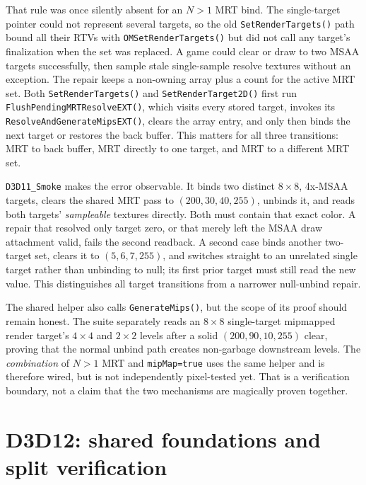 That rule was once silently absent for an \(N>1\) MRT bind. The single-target pointer could not
represent several targets, so the old \texttt{SetRenderTargets()} path bound all their RTVs with
\texttt{OMSetRenderTargets()} but did not call any target's finalization when the set was
replaced. A game could clear or draw to two MSAA targets successfully, then sample stale
single-sample resolve textures without an exception. The repair keeps a non-owning array plus a
count for the active MRT set. Both \texttt{SetRenderTargets()} and
\texttt{SetRenderTarget2D()} first run \texttt{Flush\allowbreak{}Pending\allowbreak{}MRT\allowbreak{}ResolveEXT()}, which visits every
stored target, invokes its \texttt{ResolveAnd\allowbreak{}Generate\allowbreak{}MipsEXT()}, clears the array entry, and only
then binds the next target or restores the back buffer. This matters for all three transitions:
MRT to back buffer, MRT directly to one target, and MRT to a different MRT set.

\texttt{D3D11\_Smoke} makes the error observable. It binds
two distinct \(8\times8\), 4x-MSAA targets, clears the shared MRT pass to
\((200,30,40,255)\), unbinds it, and reads both targets' \emph{sampleable} textures directly.
Both must contain that exact color. A repair that resolved only target zero, or that merely left
the MSAA draw attachment valid, fails the second readback. A second case binds another two-target
set, clears it to \((5,6,7,255)\), and switches straight to an unrelated single target rather
than unbinding to null; its first prior target must still read the new value. This distinguishes
all target transitions from a narrower null-unbind repair.

The shared helper also calls \texttt{GenerateMips()}, but the scope of its proof should remain
honest. The suite separately reads an \(8\times8\) single-target mipmapped render target's
\(4\times4\) and \(2\times2\) levels after a solid \((200,90,10,255)\) clear, proving that the
normal unbind path creates non-garbage downstream levels. The \emph{combination} of \(N>1\)
MRT and \texttt{mipMap=true} uses the same helper and is therefore wired, but is not independently
pixel-tested yet. That is a verification boundary, not a claim that the two mechanisms are
magically proven together.

\section{D3D12: shared foundations and split verification}

